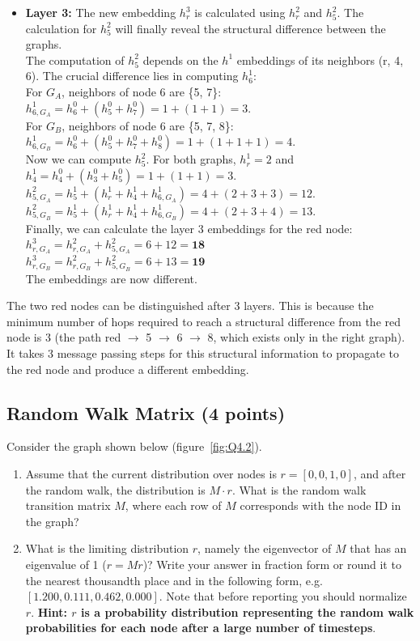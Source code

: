 \documentclass{article}
\numberwithin{figure}{section}
\begin{document}
{\begin{itemize}
			\item \textbf{Layer 3:} The new embedding $h^3_r$ is calculated using $h^2_r$ and $h^2_5$. The calculation for $h^2_5$ will finally reveal the structural difference between the graphs.
			\\ The computation of $h^2_5$ depends on the $h^1$ embeddings of its neighbors (r, 4, 6). The crucial difference lies in computing $h^1_6$:
			\\ For $G_A$, neighbors of node 6 are \{5, 7\}: $h^1_{6, G_A} = h^0_6 + (h^0_5 + h^0_7) = 1 + (1+1) = 3$.
			\\ For $G_B$, neighbors of node 6 are \{5, 7, 8\}: $h^1_{6, G_B} = h^0_6 + (h^0_5 + h^0_7 + h^0_8) = 1 + (1+1+1) = 4$.
			\\ Now we can compute $h^2_5$. For both graphs, $h^1_r=2$ and $h^1_4 = h^0_4 + (h^0_3+h^0_5) = 1+(1+1)=3$.
			\\ $h^2_{5, G_A} = h^1_5 + (h^1_r + h^1_4 + h^1_{6, G_A}) = 4 + (2 + 3 + 3) = 12$.
			\\ $h^2_{5, G_B} = h^1_5 + (h^1_r + h^1_4 + h^1_{6, G_B}) = 4 + (2 + 3 + 4) = 13$.
			\\ Finally, we can calculate the layer 3 embeddings for the red node:
			\\ $h^3_{r, G_A} = h^2_{r, G_A} + h^2_{5, G_A} = 6 + 12 = \mathbf{18}$
			\\ $h^3_{r, G_B} = h^2_{r, G_B} + h^2_{5, G_B} = 6 + 13 = \mathbf{19}$
			\\ The embeddings are now different.
		\end{itemize}
		The two red nodes can be distinguished after 3 layers. This is because the minimum number of hops required to reach a structural difference from the red node is 3 (the path red $\rightarrow$ 5 $\rightarrow$ 6 $\rightarrow$ 8, which exists only in the right graph). It takes 3 message passing steps for this structural information to propagate to the red node and produce a different embedding.
	}
	
	\subsection{Random Walk Matrix (4 points)}
	
	Consider the graph shown below (figure~\ref{fig:Q4.2}).
	\begin{enumerate}
		\item Assume that the current distribution over nodes is $r = [0,0,1,0]$, and after the random walk, the distribution is $M \cdot r$. What is the random walk transition matrix $M$, where each row of $M$ corresponds with the node ID in the graph?
		\item What is the limiting distribution $r$, namely the eigenvector of $M$ that has an eigenvalue of 1 ($r = Mr$)? Write your answer in fraction form or round it to the nearest thousandth place and in the following form, e.g. $[1.200, 0.111, 0.462, 0.000]$. Note that before reporting you should normalize $r$. \textbf{Hint: $r$ is a probability distribution representing the random walk probabilities for each node after a large number of timesteps}.
	\end{enumerate}
	
\end{document}
